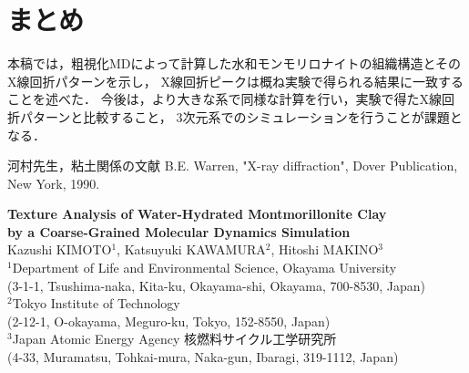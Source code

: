 ﻿\documentclass[11pt,a4j]{jarticle}
\begin{document}
\section{まとめ}
本稿では，粗視化MDによって計算した水和モンモリロナイトの組織構造とそのX線回折パターンを示し，
X線回折ピークは概ね実験で得られる結果に一致することを述べた．
今後は，より大きな系で同様な計算を行い，実験で得たX線回折パターンと比較すること，
3次元系でのシミュレーションを行うことが課題となる．
\begin{thebibliography}{99}
	河村先生，粘土関係の文献
	B.E. Warren, "X-ray diffraction", Dover Publication, New York, 1990.
\end{thebibliography}
\clearpage
\begin{center}
{\large \bf
Texture Analysis of Water-Hydrated Montmorillonite Clay\\ 
by a Coarse-Grained Molecular Dynamics Simulation
}
\\ \vspace{5mm}
Kazushi KIMOTO$^1$, Katsuyuki KAWAMURA$^2$, Hitoshi MAKINO$^3$\\
\vspace{5mm}
$^1$Department of Life and Environmental Science, Okayama University\\
(3-1-1, Tsushima-naka, Kita-ku, Okayama-shi, Okayama, 700-8530, Japan)
\\
$^2$Tokyo Institute of Technology\\ (2-12-1, O-okayama, Meguro-ku, Tokyo, 152-8550, Japan)\\
$^3$Japan Atomic Energy Agency 核燃料サイクル工学研究所\\
(4-33, Muramatsu, Tohkai-mura, Naka-gun, Ibaragi, 319-1112, Japan)
\end{center}
\end{document}
